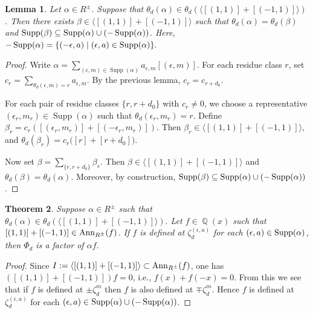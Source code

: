 \documentclass[12t,a4paper]{amsart}
\newtheorem{thm}{Theorem}[section]
\newtheorem{lem}[thm]{Lemma}
\theoremstyle{definition}
\newtheorem{rem}[thm]{Remark}
\DeclareMathOperator{\Q}{\mathbb{Q}}
\DeclareMathOperator{\supp}{{\rm Supp}}
\DeclareMathOperator{\Supp}{\text{Supp}}
\newcommand{\Ann}{{\rm Ann}}
\numberwithin{equation}{section}
\begin{document}
{\begin{lem}
Let $\alpha\in R^\pm$. Suppose that $\theta_d(\alpha)\in \theta_d(\langle[(1,1)]+[(-1,1)] \rangle)$. Then there exists $\beta\in \langle [(1,1)]+[(-1,1)] \rangle$ such that $\theta_d(\alpha)=\theta_d(\beta)$ and $\supp(\beta)\subseteq \supp(\alpha)\cup(-\supp(\alpha))$. Here, $-\supp(\alpha)=\{(-\epsilon,a)\mid  (\epsilon,a)\in \supp(\alpha)\}.$
\end{lem}

\begin{proof}
Write
\(
\alpha=\sum\limits_{(\epsilon,m)\in \Supp(\alpha)}
a_{\epsilon,m}[(\epsilon,m)].
\)
For each residue class $r$, set
\(
c_r=\sum\limits_{\theta_d(\epsilon,m)=r}a_{\epsilon,m}.\) 
By the previous lemma,
\(
c_r=c_{r+d_0}.
\)

For each pair of residue classes \(\{r,r+d_0\}\)
with $c_r\neq 0$, we choose a representative \((\epsilon_r,m_r)\in \Supp(\alpha)\)
such that
\( \theta_d(\epsilon_r,m_r)=r.\)
Define \( \beta_r =c_r\left([(\epsilon_r,m_r)]+[(-\epsilon_r,m_r)]\right).\)
Then $\beta_r\in \langle [(1,1)]+[(-1,1)] \rangle$, and
\(
\theta_d(\beta_r) = c_r\big([r]+[r+d_0]\big). \)

Now set
\( \beta=\sum\limits_{\{r,r+d_0\}}\beta_r.\)
Then $\beta\in \langle [(1,1)]+[(-1,1)] \rangle$ and
\(
\theta_d(\beta)=\theta_d(\alpha).
\)
Moreover, by construction,
$\supp(\beta)\subseteq \supp(\alpha)\cup(-\supp(\alpha))$.
\end{proof}

\begin{thm} \label{thm:mahler-congruence_signed_01}
     Suppose $\alpha \in R^\pm$ such that $\theta_d(\alpha) \in \theta_d(\langle [(1,1)]+[(-1,1)] \rangle).$ Let $f \in \Q(x)$ such that $[(1,1)]+[(-1,1)]\in \Ann_{R^\pm}(f)$. If $f$ is defined at $\zeta_d^{(\epsilon,a)}$ for each $(\epsilon,a) \in \supp(\alpha)$, then $\Phi_d$ is a factor of $\alpha f$. 
\end{thm}
\begin{proof}
 Since $I:=\langle [(1,1)]+[(-1,1)] \rangle \subset \Ann_{R^\pm}(f)$, one has $([(1,1)]+[(-1,1)])f=0$, i.e., $f(x)+f(-x)=0$. From this we see that if $f$ is defined at $\pm\zeta_d^m$  then $f$ is also defined at $\mp\zeta_d^{m}$. Hence $f$ is defined at $\zeta_d^{(\epsilon,a)}$ for each $(\epsilon,a)\in \supp(\alpha)\cup(-\supp(\alpha))$.


\end{proof}}
\end{document}
